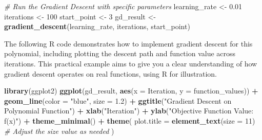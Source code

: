 \documentclass[
  12 pt,
  a4paper,
]{book}
\newenvironment{Shaded}{\begin{snugshade}}{\end{snugshade}}
\newcommand{\AttributeTok}[1]{\textcolor[rgb]{0.13,0.29,0.53}{#1}}
\newcommand{\CommentTok}[1]{\textcolor[rgb]{0.56,0.35,0.01}{\textit{#1}}}
\newcommand{\DecValTok}[1]{\textcolor[rgb]{0.00,0.00,0.81}{#1}}
\newcommand{\FloatTok}[1]{\textcolor[rgb]{0.00,0.00,0.81}{#1}}
\newcommand{\FunctionTok}[1]{\textcolor[rgb]{0.13,0.29,0.53}{\textbf{#1}}}
\newcommand{\NormalTok}[1]{#1}
\newcommand{\OtherTok}[1]{\textcolor[rgb]{0.56,0.35,0.01}{#1}}
\newcommand{\SpecialCharTok}[1]{\textcolor[rgb]{0.81,0.36,0.00}{\textbf{#1}}}
\newcommand{\StringTok}[1]{\textcolor[rgb]{0.31,0.60,0.02}{#1}}
\numberwithin{equation}{section}
\theoremstyle{plain}      %
\theoremstyle{definition} %
\theoremstyle{remark}     %
\theoremstyle{note}         %
\begin{document}
\begin{Shaded}
\begin{Highlighting}[]
\CommentTok{\# Run the Gradient Descent with specific parameters}
\NormalTok{learning\_rate }\OtherTok{\textless{}{-}} \FloatTok{0.01}
\NormalTok{iterations }\OtherTok{\textless{}{-}} \DecValTok{100}
\NormalTok{start\_point }\OtherTok{\textless{}{-}} \DecValTok{3}
\NormalTok{gd\_result }\OtherTok{\textless{}{-}} \FunctionTok{gradient\_descent}\NormalTok{(learning\_rate, iterations, start\_point)}
\end{Highlighting}
\end{Shaded}

\normalsize

The following R code demonstrates how to implement gradient descent for
this polynomial, including plotting the descent path and function value
across iterations. This practical example aims to give you a clear
understanding of how gradient descent operates on real functions, using
R for illustration.

\scriptsize

\begin{Shaded}
\begin{Highlighting}[]
\FunctionTok{library}\NormalTok{(ggplot2)}
\FunctionTok{ggplot}\NormalTok{(gd\_result, }\FunctionTok{aes}\NormalTok{(}\AttributeTok{x =}\NormalTok{ Iteration, }\AttributeTok{y =}\NormalTok{ function\_values)) }\SpecialCharTok{+}
  \FunctionTok{geom\_line}\NormalTok{(}\AttributeTok{color =} \StringTok{"blue"}\NormalTok{, }\AttributeTok{size =} \FloatTok{1.2}\NormalTok{) }\SpecialCharTok{+}
  \FunctionTok{ggtitle}\NormalTok{(}\StringTok{"Gradient Descent on Polynomial Function"}\NormalTok{) }\SpecialCharTok{+}
  \FunctionTok{xlab}\NormalTok{(}\StringTok{"Iteration"}\NormalTok{) }\SpecialCharTok{+}
  \FunctionTok{ylab}\NormalTok{(}\StringTok{"Objective Function Value: f(x)"}\NormalTok{) }\SpecialCharTok{+}
  \FunctionTok{theme\_minimal}\NormalTok{() }\SpecialCharTok{+}
  \FunctionTok{theme}\NormalTok{(}
    \AttributeTok{plot.title =} \FunctionTok{element\_text}\NormalTok{(}\AttributeTok{size =} \DecValTok{11}\NormalTok{)  }\CommentTok{\# Adjust the size value as needed}
\NormalTok{  )}
\end{Highlighting}
\end{Shaded}
\end{document}
